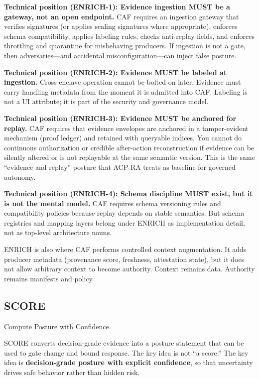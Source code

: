 \documentclass[11pt]{article}
\begin{document}
\textbf{Technical position (ENRICH-1): Evidence ingestion MUST be a
gateway, not an open endpoint.} CAF requires an ingestion gateway that
verifies signatures (or applies sealing signatures where appropriate),
enforces schema compatibility, applies labeling rules, checks
anti-replay fields, and enforces throttling and quarantine for
misbehaving producers. If ingestion is not a gate, then
adversaries---and accidental misconfiguration---can inject false
posture.

\textbf{Technical position (ENRICH-2): Evidence MUST be labeled at
ingestion.} Cross-enclave operation cannot be bolted on later. Evidence
must carry handling metadata from the moment it is admitted into CAF.
Labeling is not a UI attribute; it is part of the security and
governance model.

\textbf{Technical position (ENRICH-3): Evidence MUST be anchored for
replay.} CAF requires that evidence envelopes are anchored in a
tamper-evident mechanism (proof ledger) and retained with queryable
indices. You cannot do continuous authorization or credible after-action
reconstruction if evidence can be silently altered or is not replayable
at the same semantic version. This is the same ``evidence and replay''
posture that ACP-RA treats as baseline for governed autonomy. \cite{ACPRA}

\textbf{Technical position (ENRICH-4): Schema discipline MUST exist, but
it is not the mental model.} CAF requires schema versioning rules and
compatibility policies because replay depends on stable semantics. But
schema registries and mapping layers belong under ENRICH as
implementation detail, not as top-level architecture nouns.

ENRICH is also where CAF performs controlled context augmentation. It
adds producer metadata (provenance score, freshness, attestation state),
but it does not allow arbitrary context to become authority. Context
remains data. Authority remains manifests and policy.

\hypertarget{score}{%
\subsection{SCORE}\label{score}}

\begin{calloutquote}
Compute Posture with Confidence.
\end{calloutquote}

SCORE converts decision-grade evidence into a posture statement that can
be used to gate change and bound response. The key idea is not ``a
score.'' The key idea is \textbf{decision-grade posture with explicit
confidence}, so that uncertainty drives safe behavior rather than hidden
risk.
\end{document}
